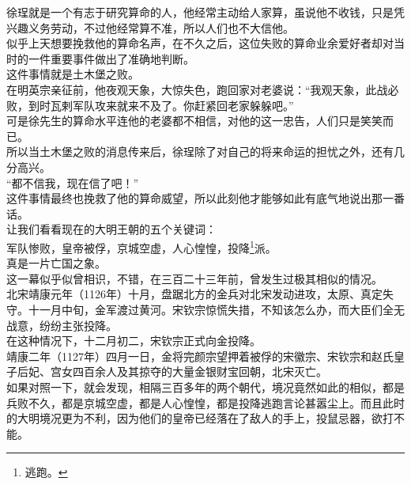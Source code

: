 \begin{multicols}{\theparacolNo}
徐珵就是一个有志于研究算命的人，他经常主动给人家算，虽说他不收钱，只是凭兴趣义务劳动，不过他经常算不准，所以人们也不大信他。\\

似乎上天想要挽救他的算命名声，在不久之后，这位失败的算命业余爱好者却对当时的一件重要事件做出了准确地判断。\\

这件事情就是土木堡之败。\\

在明英宗亲征前，他夜观天象，大惊失色，跑回家对老婆说：“我观天象，此战必败，到时瓦剌军队攻来就来不及了。你赶紧回老家躲躲吧。”\\

可是徐先生的算命水平连他的老婆都不相信，对他的这一忠告，人们只是笑笑而已。\\

所以当土木堡之败的消息传来后，徐珵除了对自己的将来命运的担忧之外，还有几分高兴。\\

“都不信我，现在信了吧！”\\

这件事情最终也挽救了他的算命威望，所以此刻他才能够如此有底气地说出那一番话。\\

让我们看看现在的大明王朝的五个关键词：\\

军队惨败，皇帝被俘，京城空虚，人心惶惶，投降\footnote{逃跑。}派。\\

真是一片亡国之象。\\

这一幕似乎似曾相识，不错，在三百二十三年前，曾发生过极其相似的情况。\\

北宋靖康元年（1126年）十月，盘踞北方的金兵对北宋发动进攻，太原、真定失守。十一月中旬，金军渡过黄河。宋钦宗惊慌失措，不知该怎么办，而大臣们全无战意，纷纷主张投降。\\

在这种情况下，十二月初二，宋钦宗正式向金投降。\\

靖康二年（1127年）四月一日，金将完颜宗望押着被俘的宋徽宗、宋钦宗和赵氏皇子后妃、宫女四百余人及其掠夺的大量金银财宝回朝，北宋灭亡。\\

如果对照一下，就会发现，相隔三百多年的两个朝代，境况竟然如此的相似，都是兵败不久，都是京城空虚，都是人心惶惶，都是投降逃跑言论甚嚣尘上。而且此时的大明境况更为不利，因为他们的皇帝已经落在了敌人的手上，投鼠忌器，欲打不能。\\


\end{multicols}
